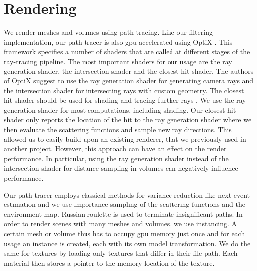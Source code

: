 \section{Rendering}
\label{sec:rendering}
We render meshes and volumes using path tracing.
Like our filtering implementation, our path tracer is also \ac{gpu} accelerated using OptiX \cite{parker_optix}.
This framework specifies a number of shaders that are called at different stages of the ray-tracing pipeline.
The most important shaders for our usage are the ray generation shader, the intersection shader and the closest hit shader.
The authors of OptiX suggest to use the ray generation shader for generating camera rays and the intersection shader for intersecting rays with custom geometry.
The closest hit shader should be used for shading and tracing further rays \cite{parker_optix}.
We use the ray generation shader for most computations, including shading.
Our closest hit shader only reports the location of the hit to the ray generation shader where we then evaluate the scattering functions and sample new ray directions.
This allowed us to easily build upon an existing renderer, that we previously used in another project.
However, this approach can have an effect on the render performance.
In particular, using the ray generation shader instead of the intersection shader for distance sampling in volumes can negatively influence performance.

Our path tracer employs classical methods for variance reduction like next event estimation and we use importance sampling of the scattering functions and the environment map.
Russian roulette is used to terminate insignificant paths.
In order to render scenes with many meshes and volumes, we use instancing.
A certain mesh or volume thus has to occupy \ac{gpu} memory just once and for each usage an instance is created, each with its own model transformation.
We do the same for textures by loading only textures that differ in their file path.
Each material then stores a pointer to the memory location of the texture.

